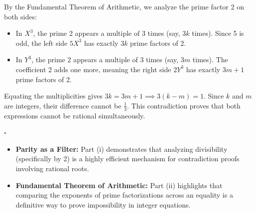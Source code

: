 \begin{solution}
By the Fundamental Theorem of Arithmetic, we analyze the prime factor 2 on both sides:
\begin{itemize}
    \item In $X^3$, the prime 2 appears a multiple of 3 times (say, $3k$ times). Since 5 is odd, the left side $5X^3$ has exactly $3k$ prime factors of 2.
    \item In $Y^3$, the prime 2 appears a multiple of 3 times (say, $3m$ times). The coefficient 2 adds one more, meaning the right side $2Y^3$ has exactly $3m + 1$ prime factors of 2.
\end{itemize}
Equating the multiplicities gives $3k = 3m + 1 \implies 3(k - m) = 1$. Since $k$ and $m$ are integers, their difference cannot be $\frac{1}{3}$. This contradiction proves that both expressions cannot be rational simultaneously.

\hfill $\square$
\end{solution}

\begin{takeaways}
\begin{itemize}
    \item \textbf{Parity as a Filter:} Part (i) demonstrates that analyzing divisibility (specifically by 2) is a highly efficient mechanism for contradiction proofs involving rational roots.
    \item \textbf{Fundamental Theorem of Arithmetic:} Part (ii) highlights that comparing the exponents of prime factorizations across an equality is a definitive way to prove impossibility in integer equations. 
\end{itemize}
\end{takeaways}
